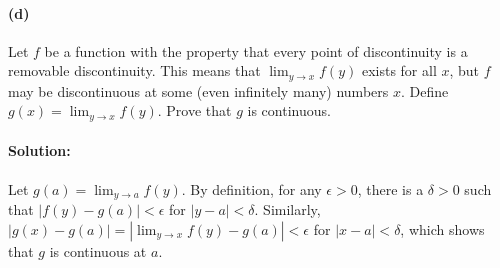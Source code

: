 \documentclass{article}
\begin{document}
\paragraph{(d)} Let $f$ be a function with the property that every point of
discontinuity is a removable discontinuity. This means that $\lim_{y
\rightarrow x}f(y)$ exists for all $x$, but $f$ may be discontinuous at some
(even infinitely many) numbers $x$. Define $g(x) = \lim_{y \rightarrow x}f(y)$.
Prove that $g$ is continuous.

\paragraph{Solution:} Let $g(a) = \lim_{y \rightarrow a}f(y)$. By definition,
for any $\epsilon > 0$, there is a $\delta > 0$ such that $|f(y) - g(a)| <
\epsilon$ for $|y - a| < \delta$. Similarly, $|g(x) - g(a)| = |\lim_{y
\rightarrow x}f(y) - g(a)| < \epsilon$ for $|x - a| < \delta$, which shows that
$g$ is continuous at $a$.
\end{document}
